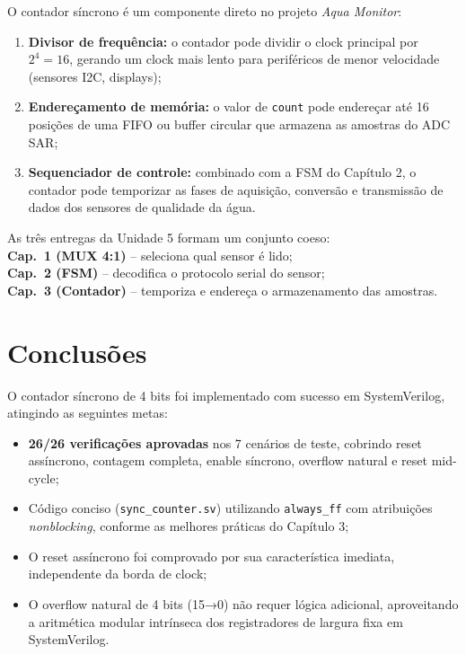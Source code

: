 \documentclass[12pt,a4paper]{article}
\begin{document}
O contador síncrono é um componente direto no projeto \textit{Aqua Monitor}:

\begin{enumerate}[leftmargin=1.5cm]
  \item \textbf{Divisor de frequência:} o contador pode dividir o clock principal
        por $2^4 = 16$, gerando um clock mais lento para periféricos de menor
        velocidade (sensores I2C, displays);
  \item \textbf{Endereçamento de memória:} o valor de \texttt{count} pode
        endereçar até 16 posições de uma FIFO ou buffer circular que armazena
        as amostras do ADC SAR;
  \item \textbf{Sequenciador de controle:} combinado com a FSM do Capítulo 2,
        o contador pode temporizar as fases de aquisição, conversão e transmissão
        de dados dos sensores de qualidade da água.
\end{enumerate}

\begin{unidadebox}
  As três entregas da Unidade 5 formam um conjunto coeso:\\
  \textbf{Cap.\ 1 (MUX 4:1)} -- seleciona qual sensor é lido;\\
  \textbf{Cap.\ 2 (FSM)} -- decodifica o protocolo serial do sensor;\\
  \textbf{Cap.\ 3 (Contador)} -- temporiza e endereça o armazenamento das amostras.
\end{unidadebox}

\section{Conclusões}

O contador síncrono de 4 bits foi implementado com sucesso em SystemVerilog,
atingindo as seguintes metas:

\begin{itemize}[leftmargin=1.5cm]
  \item \textbf{26/26 verificações aprovadas} nos 7 cenários de teste, cobrindo
        reset assíncrono, contagem completa, enable síncrono, overflow natural
        e reset mid-cycle;
  \item Código conciso (\texttt{sync\_counter.sv}) utilizando \texttt{always\_ff}
        com atribuições \textit{nonblocking}, conforme as melhores práticas do
        Capítulo 3;
  \item O reset assíncrono foi comprovado por sua característica imediata,
        independente da borda de clock;
  \item O overflow natural de 4 bits (15→0) não requer lógica adicional,
        aproveitando a aritmética modular intrínseca dos registradores de
        largura fixa em SystemVerilog.
\end{itemize}
\end{document}
